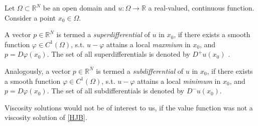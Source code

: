 	\begin{definition}
		Let $ \Omega \subset \mathbb{R}^N $ be an open domain and $ u : \Omega \to \mathbb{R} $ a real-valued, continuous function. Consider a point $ x_0 \in \Omega $. 
		
		A vector $ p \in \mathbb{R}^N $ is termed a \emph{superdifferential} of $ u $ in $ x_0 $, if there exists a smooth function $ \varphi \in C^{1}(\Omega) $, s.t. $ u - \varphi $ attains a local \emph{maxmium} in $ x_0 $, and $ p = D \varphi(x_0) $. The set of all superdifferentials is denoted by $ D^{+}u(x_0) $ .
		
		Analogously, a vector $ p \in \mathbb{R}^N $ is termed a \emph{subdifferential} of $ u $ in $ x_0 $, if there exists a smooth function $ \varphi \in C^{1}(\Omega) $, s.t. $ u - \varphi $ attains a local \emph{minimum} in $ x_0 $, and $ p = D \varphi(x_0) $. The set of all subdifferentials is denoted by $ D^{-}u(x_0) $.
	\end{definition}

	Viscosity solutions would not be of interest to us, if the value function was not a viscosity solution of \eqref{HJB}.
	
